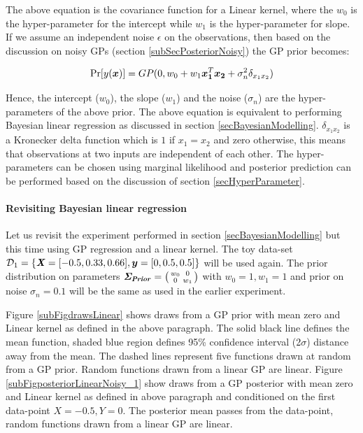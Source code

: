 The above equation is the covariance function for a Linear kernel, where the $w_{0}$ is the hyper-parameter for the intercept while $w_{1}$ is the hyper-parameter for slope. If we assume an independent noise $\epsilon$ on the observations, then based on the discussion on noisy GPs (section \ref{subSecPosteriorNoisy}) the GP prior becomes:

\begin{equation}\label{eqNoisyPriorDistributionOverLinearFunctions}
    \Pr[y(\boldsymbol{x})] = GP(0, w_{0} + w_{1} \boldsymbol{x_{1}}^T \boldsymbol{x_{2}} + \sigma_{n}^2\delta_{x_{1} x_{2}})
\end{equation}

Hence, the intercept ($w_{0}$), the slope ($w_{1}$) and the noise ($\sigma_{n}$) are the hyper-parameters of the above prior. The above equation is equivalent to performing Bayesian linear regression as discussed in section \ref{secBayesianModelling}. $\delta_{x_{1}x_{2}}$ is a Kronecker delta function which is $1$ if $x_{1} = x_{2}$ and zero otherwise, this means that observations at two inputs are independent of each other. The hyper-parameters can be chosen using marginal likelihood and posterior prediction can be performed based on the discussion of section \ref{secHyperParameter}. 

\begin{mdframed}[hidealllines=true,backgroundcolor=lightgray!20]
\paragraph{Revisiting Bayesian linear regression}\label{paraLinearGPExperiment}
Let us revisit the experiment performed in section \ref{secBayesianModelling} but this time using GP regression and a linear kernel. The toy data-set $\mathcal{D}_{1} = \{\bm{\mathit{X}} = [-0.5, 0.33, 0.66], \boldsymbol{y} = [0, 0.5, 0.5]\}$ will be used again. The prior distribution on parameters $\bm{\mathit{\Sigma_{Prior}}} =  \bigl( \begin{smallmatrix} w_{0} & 0\\ 0 & w_{1}\end{smallmatrix}\bigr)$  with $w_{0} = 1, w_{1} = 1$ and prior on noise $\sigma_{n} = 0.1$ will be the same as used in the earlier experiment. 

Figure \ref{subFigdrawsLinear} shows draws from a GP prior with mean zero and Linear kernel as defined in the above paragraph. The solid black line defines the mean function, shaded blue region defines 95\% confidence interval (2$\sigma$) distance away from the mean. The dashed lines represent five functions drawn at random from a GP prior. Random functions drawn from a linear GP are linear. Figure \ref{subFigposteriorLinearNoisy_1} show draws from a GP posterior with mean zero and Linear kernel  as defined in above paragraph and conditioned on the first data-point $X = -0.5, Y = 0$. The posterior mean passes from the data-point, random functions drawn from a linear GP are linear.
\end{mdframed}

